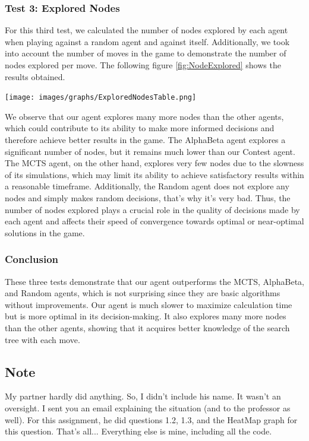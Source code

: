 \documentclass[11pt,a4paper]{report}
\begin{document}
\begin{answers}[23cm]

\subsubsection{Test 3: Explored Nodes}
For this third test, we calculated the number of nodes explored by each agent when playing against a random agent and against itself. Additionally, we took into account the number of moves in the game to demonstrate the number of nodes explored per move. The following figure \ref{fig:NodeExplored} shows the results obtained.

\begin{center}
\texttt{[image: images/graphs/ExploredNodesTable.png]}
\label{fig:NodeExplored}
\end{center}

We observe that our agent explores many more nodes than the other agents, which could contribute to its ability to make more informed decisions and therefore achieve better results in the game. The AlphaBeta agent explores a significant number of nodes, but it remains much lower than our Contest agent. The MCTS agent, on the other hand, explores very few nodes due to the slowness of its simulations, which may limit its ability to achieve satisfactory results within a reasonable timeframe. Additionally, the Random agent does not explore any nodes and simply makes random decisions, that's why it's very bad. Thus, the number of nodes explored plays a crucial role in the quality of decisions made by each agent and affects their speed of convergence towards optimal or near-optimal solutions in the game.

\subsubsection{Conclusion}
These three tests demonstrate that our agent outperforms the MCTS, AlphaBeta, and Random agents, which is not surprising since they are basic algorithms without improvements. Our agent is much slower to maximize calculation time but is more optimal in its decision-making. It also explores many more nodes than the other agents, showing that it acquires better knowledge of the search tree with each move.

\subsection{Note}
My partner hardly did anything. So, I didn’t include his name. It wasn’t an oversight. I sent you an
email explaining the situation (and to the professor as well). For this assignment, he did questions
1.2, 1.3, and the HeatMap graph for this question. That’s all... Everything else is mine, including all
the code.

\end{answers}
\end{document}

